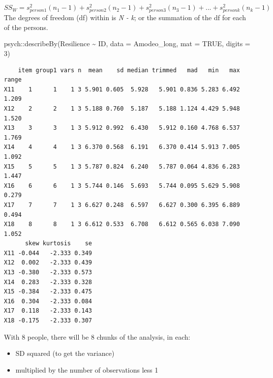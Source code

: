 \documentclass[
  11pt,
]{book}
\newenvironment{Shaded}{\begin{snugshade}}{\end{snugshade}}
\newcommand{\AttributeTok}[1]{\textcolor[rgb]{0.77,0.63,0.00}{#1}}
\newcommand{\ConstantTok}[1]{\textcolor[rgb]{0.00,0.00,0.00}{#1}}
\newcommand{\DecValTok}[1]{\textcolor[rgb]{0.00,0.00,0.81}{#1}}
\newcommand{\FunctionTok}[1]{\textcolor[rgb]{0.00,0.00,0.00}{#1}}
\newcommand{\NormalTok}[1]{#1}
\newcommand{\SpecialCharTok}[1]{\textcolor[rgb]{0.00,0.00,0.00}{#1}}
\providecommand{\tightlist}{%
  \setlength{\itemsep}{0pt}\setlength{\parskip}{0pt}}
\begin{document}
\[SS_W = s_{person1}^{2}(n_{1}-1)+s_{person2}^{2}(n_{2}-1)+s_{person3}^{2}(n_{3}-1)+...+s_{personk}^{2}(n_{k}-1)\]
The degrees of freedom (df) within is \emph{N - k}; or the summation of the df for each of the persons.

\begin{Shaded}
\begin{Highlighting}[]
\NormalTok{psych}\SpecialCharTok{::}\FunctionTok{describeBy}\NormalTok{(Resilience }\SpecialCharTok{\textasciitilde{}}\NormalTok{ ID, }\AttributeTok{data =}\NormalTok{ Amodeo\_long, }\AttributeTok{mat =} \ConstantTok{TRUE}\NormalTok{, }\AttributeTok{digits =} \DecValTok{3}\NormalTok{)}
\end{Highlighting}
\end{Shaded}

\begin{verbatim}
    item group1 vars n  mean    sd median trimmed   mad   min   max range
X11    1      1    1 3 5.901 0.605  5.928   5.901 0.836 5.283 6.492 1.209
X12    2      2    1 3 5.188 0.760  5.187   5.188 1.124 4.429 5.948 1.520
X13    3      3    1 3 5.912 0.992  6.430   5.912 0.160 4.768 6.537 1.769
X14    4      4    1 3 6.370 0.568  6.191   6.370 0.414 5.913 7.005 1.092
X15    5      5    1 3 5.787 0.824  6.240   5.787 0.064 4.836 6.283 1.447
X16    6      6    1 3 5.744 0.146  5.693   5.744 0.095 5.629 5.908 0.279
X17    7      7    1 3 6.627 0.248  6.597   6.627 0.300 6.395 6.889 0.494
X18    8      8    1 3 6.612 0.533  6.708   6.612 0.565 6.038 7.090 1.052
      skew kurtosis    se
X11 -0.044   -2.333 0.349
X12  0.002   -2.333 0.439
X13 -0.380   -2.333 0.573
X14  0.283   -2.333 0.328
X15 -0.384   -2.333 0.475
X16  0.304   -2.333 0.084
X17  0.118   -2.333 0.143
X18 -0.175   -2.333 0.307
\end{verbatim}

With 8 people, there will be 8 chunks of the analysis, in each:

\begin{itemize}
\tightlist
\item
  SD squared (to get the variance)
\item
  multiplied by the number of observations less 1
\end{itemize}
\end{document}
